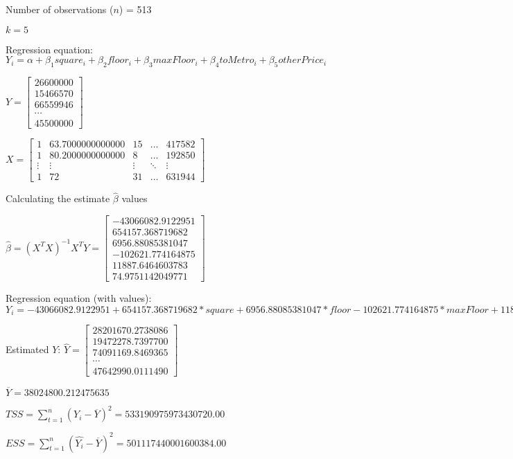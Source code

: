 \documentclass{article}
\begin{document}
Number of observations ($n$) = 513

$k=5$

Regression equation: 
$Y_i=\alpha+\beta_1square_i+\beta_2floor_i+\beta_3maxFloor_i+\beta_4toMetro_i+\beta_5otherPrice_i$


$Y=\left[\begin{matrix}26600000\\15466570\\66559946\\\cdots\\45500000\end{matrix}\right]$


$X=\begin{bmatrix}1 & 63.7000000000000 & 15 & \dots  & 417582 \\ 1 & 80.2000000000000 & 8 & \dots  & 192850 \\ \vdots & \vdots & \vdots & \ddots & \vdots \\ 1 & 72 & 31 & \dots  & 631944\end{bmatrix}$

Calculating the estimate $\hat\beta$ values

$\hat{\beta}=(X^TX)^{-1}X^TY=\left[\begin{matrix}-43066082.9122951\\654157.368719682\\6956.88085381047\\-102621.774164875\\11887.6464603783\\74.9751142049771\end{matrix}\right]$

Regression equation (with values): $Y_i=-43066082.9122951+654157.368719682*square+6956.88085381047*floor-102621.774164875*maxFloor+11887.6464603783*toMetro+74.9751142049771*otherPrice$


Estimated $Y$: $\hat{Y}=\left[\begin{matrix}28201670.2738086\\19472278.7397700\\74091169.8469365\\\cdots\\47642990.0111490\end{matrix}\right]$

$\overline{Y}=38024800.212475635$

$TSS=\sum_{t=1}^{n} (Y_i-\overline{Y})^2=533190975973430720.00$

$ESS=\sum_{t=1}^{n} (\hat{Y_i}-\overline{Y})^2=501117440001600384.00$
\end{document}
